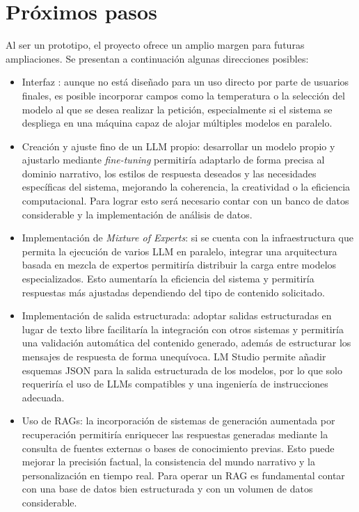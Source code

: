 \section{Próximos pasos}
Al ser un prototipo, el proyecto ofrece un amplio margen para futuras ampliaciones.
Se presentan a continuación algunas direcciones posibles:

\begin{itemize}
\item Interfaz :
      aunque no está diseñado para un uso directo por parte de usuarios finales,
      es posible incorporar campos como la temperatura o la selección del modelo
      al que se desea realizar la petición, especialmente si el sistema se despliega
      en una máquina capaz de alojar múltiples modelos en paralelo.
\item Creación y ajuste fino de un LLM propio:
      desarrollar un modelo propio y ajustarlo mediante \textit{fine-tuning}
      permitiría adaptarlo de forma precisa al dominio narrativo,
      los estilos de respuesta deseados y las necesidades específicas del sistema,
      mejorando la coherencia, la creatividad o la eficiencia computacional.
      Para lograr esto será necesario contar con un banco de datos considerable y la
      implementación de análisis de datos.
\item Implementación de \textit{Mixture of Experts}:
      si se cuenta con la infraestructura que permita la ejecución de varios LLM en paralelo,
      integrar una arquitectura basada en mezcla de expertos permitiría distribuir
      la carga entre modelos especializados.
      Esto aumentaría la eficiencia del sistema y permitiría
      respuestas más ajustadas dependiendo del tipo de contenido solicitado.
\item Implementación de salida estructurada:
      adoptar salidas estructuradas en lugar de texto libre 
      facilitaría la integración con otros sistemas
      y permitiría una validación automática del contenido generado,
      además de estructurar los mensajes de respuesta de forma unequívoca.
      LM Studio permite añadir esquemas JSON para la salida estructurada de los modelos,
      por lo que solo requeriría el uso de LLMs compatibles y una ingeniería de
      instrucciones adecuada.
\item Uso de RAGs:
      la incorporación de sistemas de generación aumentada por recuperación
      permitiría enriquecer las respuestas generadas mediante la consulta de
      fuentes externas o bases de conocimiento previas.
      Esto puede mejorar la precisión factual, la consistencia del mundo narrativo
      y la personalización en tiempo real.
      Para operar un RAG es fundamental contar con una base de datos bien estructurada
      y con un volumen de datos considerable.
\end{itemize}

